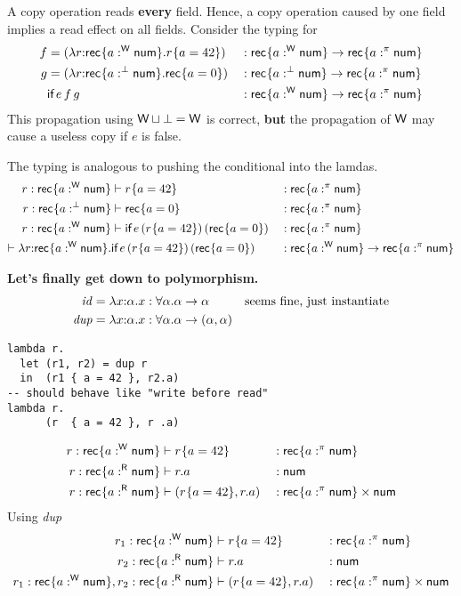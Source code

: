\documentclass{llncs}
\begin{document}
A copy operation reads \textbf{every} field. Hence, a copy operation
caused by one field implies a read effect on all fields.
\clearpage{}
Consider the typing for 
\begin{align*}
  f
  &=(\lambda r{:}\textsf{rec}^{{}}\{ a:^\textsf{W} \textsf{num}\}. r^{{}}\{a=42\})
  &&: \textsf{rec}^{{}}\{ a:^\textsf{W} \textsf{num}\} \to \textsf{rec}^{{}}\{ a:^\pi \textsf{num}\}
  \\
  g
  &=(\lambda r{:}\textsf{rec}^{{}}\{a :^\bot \textsf{num}\}. \textsf{rec}^{{}}\{a = 0\})
  &&: \textsf{rec}^{{}}\{a :^\bot \textsf{num}\} \to \textsf{rec}^{{}}\{ a:^\pi \textsf{num}\}
  \\
  &\textsf{if}\,e\,f\,{g}
  &&: \textsf{rec}^{{}}\{ a:^\textsf{W} \textsf{num}\} \to \textsf{rec}^{{}}\{ a:^\pi \textsf{num}\}
\end{align*}
This propagation using $\textsf{W}\sqcup\bot = \textsf{W}$ is correct,
\textbf{but} the propagation of $\textsf{W}$  may cause a useless copy if $e$ is false.

The typing is analogous to pushing the conditional into the lamdas.
\begin{align*}
  r : \textsf{rec}^{{}}\{ a:^\textsf{W} \textsf{num}\} & \vdash r^{{}}\{a=42\} &&: \textsf{rec}^{{}}\{ a:^\pi \textsf{num}\}
  \\
  r : \textsf{rec}^{{}}\{ a:^\bot \textsf{num}\} & \vdash \textsf{rec}^{{}}\{a = 0\} &&: \textsf{rec}^{{}}\{ a:^\pi \textsf{num}\}
  \\
  r : \textsf{rec}^{{}}\{ a:^\textsf{W} \textsf{num}\}& \vdash \textsf{if}\,e\,( r^{{}}\{a=42\})\,{(\textsf{rec}^{{}}\{a = 0\})} &&: \textsf{rec}^{{}}\{ a:^\pi \textsf{num}\}
  \\
  \vdash \lambda r{:}\textsf{rec}^{{}}\{ a:^\textsf{W} \textsf{num}\}. & \textsf{if}\,e\,( r^{{}}\{a=42\})\,{(\textsf{rec}^{{}}\{a = 0\})}
                                                  &&: {\textsf{rec}^{{}}\{ a:^\textsf{W} \textsf{num}\}} \to \textsf{rec}^{{}}\{ a:^\pi \textsf{num}\}
\end{align*}

\textbf{Let's finally get down to polymorphism. }
\begin{align*}
  \mathit{id} =
  \lambda x{:}\alpha. x & : \forall\alpha.\alpha\to\alpha
  &&\text{seems fine, just instantiate}
  \\
  \mathit{dup} =
  \lambda x{:}\alpha. x & : \forall\alpha.\alpha\to(\alpha,\alpha)
\end{align*}
\begin{verbatim}
lambda r.
  let (r1, r2) = dup r 
  in  (r1 { a = 42 }, r2.a)
-- should behave like "write before read"
lambda r. 
      (r  { a = 42 }, r .a)
\end{verbatim}
\begin{align*}
  r : \textsf{rec}^{{}}\{ a:^\textsf{W} \textsf{num}\} & \vdash r^{{}}\{a=42\} &&: \textsf{rec}^{{}}\{ a:^\pi \textsf{num}\}
  \\
  r : \textsf{rec}^{{}}\{ a:^\textsf{R} \textsf{num}\} & \vdash  r. a &&: \textsf{num}
  \\
  r : \textsf{rec}^{{}}\{ a:^\textsf{R} \textsf{num}\} & \vdash (r^{{}}\{a=42\}, r. a)  &&: \textsf{rec}^{{}}\{ a:^\pi \textsf{num}\} \times \textsf{num}
\end{align*}
Using \textit{dup}
\begin{align*}
  r_1 : \textsf{rec}^{{}}\{ a:^\textsf{W} \textsf{num}\} & \vdash r^{{}}\{a=42\} &&: \textsf{rec}^{{}}\{ a:^\pi \textsf{num}\}
  \\
  r_2 : \textsf{rec}^{{}}\{ a:^\textsf{R} \textsf{num}\} & \vdash  r. a &&: \textsf{num}
  \\
  r_1 : \textsf{rec}^{{}}\{ a:^\textsf{W} \textsf{num}\},
  r_2 : \textsf{rec}^{{}}\{ a:^\textsf{R} \textsf{num}\} & \vdash  (r^{{}}\{a=42\} , r. a) &&: \textsf{rec}^{{}}\{ a:^\pi \textsf{num}\} \times \textsf{num}
\end{align*}
\end{document}
